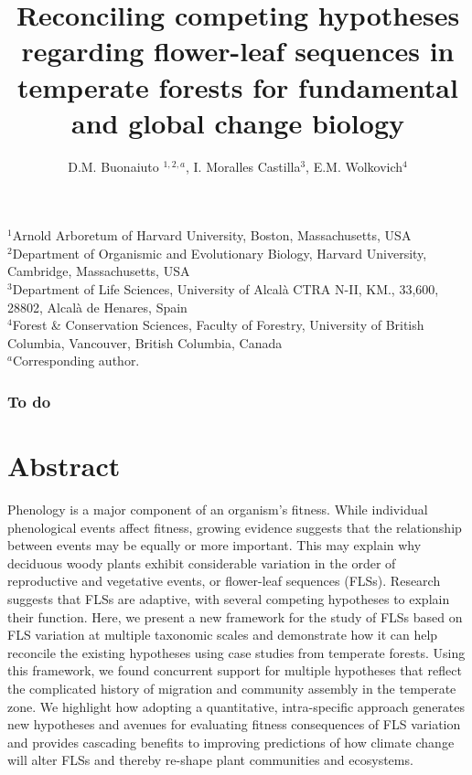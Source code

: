 \documentclass{article}
\title{Reconciling competing hypotheses regarding flower-leaf sequences in temperate forests for fundamental and global change biology}
\author{D.M. Buonaiuto $^{1,2,a}$, I. Moralles Castilla$^{3}$, E.M. Wolkovich$^{4}$}
\begin{document}
\maketitle
\noindent $^1$Arnold Arboretum of Harvard University, Boston, Massachusetts, USA\\
$^2$Department of Organismic and Evolutionary Biology, Harvard University, Cambridge, Massachusetts, USA\\
$^3$Department of Life Sciences, University of Alcal\`a CTRA N-II, KM., 33,600, 28802, Alcal\`a de Henares, Spain\\
$^4$Forest \& Conservation Sciences, Faculty of Forestry, University of British Columbia, Vancouver, British Columbia, Canada\\
$^a$Corresponding author.
\subsubsection*{To do}

\section*{Abstract}
Phenology is a major component of an organism's fitness. While individual phenological events affect fitness, growing evidence suggests that the relationship between events may be equally or more important. This may explain why deciduous woody plants exhibit considerable variation in the order of reproductive and vegetative events, or flower-leaf sequences (FLSs). Research suggests that FLSs are adaptive, with several competing hypotheses to explain their function. Here, we present a new framework for the study of FLSs based on FLS variation at multiple taxonomic scales and demonstrate how it can help reconcile the existing hypotheses using case studies from temperate forests. Using this framework, we found concurrent support for multiple hypotheses that reflect the complicated history of migration and community assembly in the temperate zone. We highlight how adopting a quantitative, intra-specific approach generates new hypotheses and avenues for evaluating fitness consequences of FLS variation and provides cascading benefits to improving predictions of how climate change will alter FLSs and thereby re-shape plant communities and ecosystems.
\end{document}
